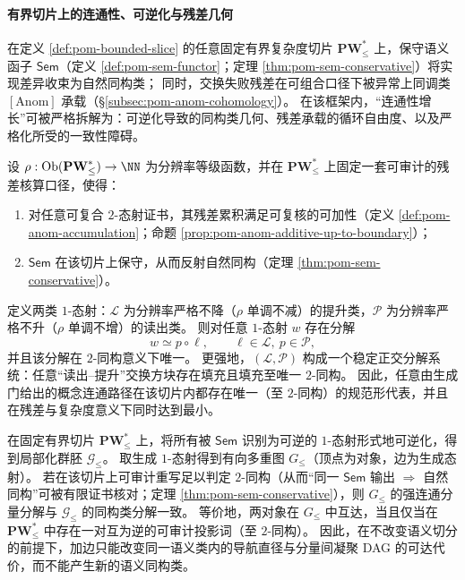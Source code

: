 
\paragraph{有界切片上的连通性、可逆化与残差几何}
在定义 \ref{def:pom-bounded-slice} 的任意固定有界复杂度切片 \(\mathbf{PW}^{\ast}_{\le}\) 上，保守语义函子 \(\mathsf{Sem}\)（定义 \ref{def:pom-sem-functor}；定理 \ref{thm:pom-sem-conservative}）将实现差异收束为自然同构类；
同时，交换失败残差在可组合口径下被异常上同调类 \([\mathrm{Anom}]\) 承载（\S\ref{subsec:pom-anom-cohomology}）。
在该框架内，“连通性增长”可被严格拆解为：可逆化导致的同构类几何、残差承载的循环自由度、以及严格化所受的一致性障碍。

\begin{conclusion}[审计可逆的正交因子分解与连通性正规形的唯一性]\label{con:xi-connectivity-orthogonal-factorization-normal-form}
设 \(\rho:\mathrm{Ob}(\mathbf{PW}^{\ast}_{\le})\to\NN\) 为分辨率等级函数，并在 \(\mathbf{PW}^{\ast}_{\le}\) 上固定一套可审计的残差核算口径，使得：
\begin{enumerate}
  \item 对任意可复合 \(2\)-态射证书，其残差累积满足可复核的可加性（定义 \ref{def:pom-anom-accumulation}；命题 \ref{prop:pom-anom-additive-up-to-boundary}）；
  \item \(\mathsf{Sem}\) 在该切片上保守，从而反射自然同构（定理 \ref{thm:pom-sem-conservative}）。
\end{enumerate}
定义两类 \(1\)-态射：\(\mathcal L\) 为分辨率严格不降（\(\rho\) 单调不减）的提升类，\(\mathcal P\) 为分辨率严格不升（\(\rho\) 单调不增）的读出类。
则对任意 \(1\)-态射 \(w\) 存在分解
\[
w\simeq p\circ \ell,\qquad \ell\in\mathcal L,\ p\in\mathcal P,
\]
并且该分解在 \(2\)-同构意义下唯一。
更强地，\((\mathcal L,\mathcal P)\) 构成一个稳定正交分解系统：任意“读出--提升”交换方块存在填充且填充至唯一 \(2\)-同构。
因此，任意由生成门给出的概念连通路径在该切片内都存在唯一（至 \(2\)-同构）的规范形代表，并且在残差与复杂度意义下同时达到最小。
\end{conclusion}

\begin{conclusion}\label{con:xi-connectivity-scc-invertible-closure}
在固定有界切片 \(\mathbf{PW}^{\ast}_{\le}\) 上，将所有被 \(\mathsf{Sem}\) 识别为可逆的 \(1\)-态射形式地可逆化，得到局部化群胚 \(\mathcal{G}_{\le}\)。
取生成 \(1\)-态射得到有向多重图 \(G_{\le}\)（顶点为对象，边为生成态射）。
若在该切片上可审计重写足以判定 \(2\)-同构（从而“同一 \(\mathsf{Sem}\) 输出 \(\Rightarrow\) 自然同构”可被有限证书核对；定理 \ref{thm:pom-sem-conservative}），则 \(G_{\le}\) 的强连通分量分解与 \(\mathcal{G}_{\le}\) 的同构类分解一致。
等价地，两对象在 \(G_{\le}\) 中互达，当且仅当在 \(\mathbf{PW}^{\ast}_{\le}\) 中存在一对互为逆的可审计投影词（至 \(2\)-同构）。
因此，在不改变语义切分的前提下，加边只能改变同一语义类内的导航直径与分量间凝聚 DAG 的可达代价，而不能产生新的语义同构类。
\end{conclusion}

